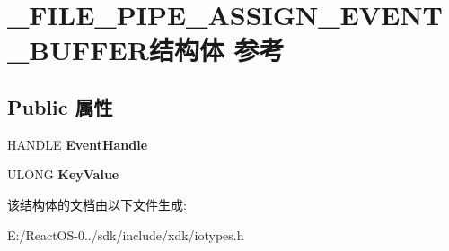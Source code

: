 \hypertarget{struct___f_i_l_e___p_i_p_e___a_s_s_i_g_n___e_v_e_n_t___b_u_f_f_e_r}{}\section{\+\_\+\+F\+I\+L\+E\+\_\+\+P\+I\+P\+E\+\_\+\+A\+S\+S\+I\+G\+N\+\_\+\+E\+V\+E\+N\+T\+\_\+\+B\+U\+F\+F\+E\+R结构体 参考}
\label{struct___f_i_l_e___p_i_p_e___a_s_s_i_g_n___e_v_e_n_t___b_u_f_f_e_r}
\subsection*{Public 属性}
\begin{DoxyCompactItemize}
\item 
\mbox{\label{struct___f_i_l_e___p_i_p_e___a_s_s_i_g_n___e_v_e_n_t___b_u_f_f_e_r_ada2c2331111ae60c25ae20292c070ab0}} 
\hyperlink{interfacevoid}{H\+A\+N\+D\+LE} {\bfseries Event\+Handle}
\item 
\mbox{\label{struct___f_i_l_e___p_i_p_e___a_s_s_i_g_n___e_v_e_n_t___b_u_f_f_e_r_a896729ee163c426454094d53db89410c}} 
U\+L\+O\+NG {\bfseries Key\+Value}
\end{DoxyCompactItemize}


该结构体的文档由以下文件生成\+:\begin{DoxyCompactItemize}
\item 
E\+:/\+React\+O\+S-\/0../sdk/include/xdk/iotypes.\+h\end{DoxyCompactItemize}
